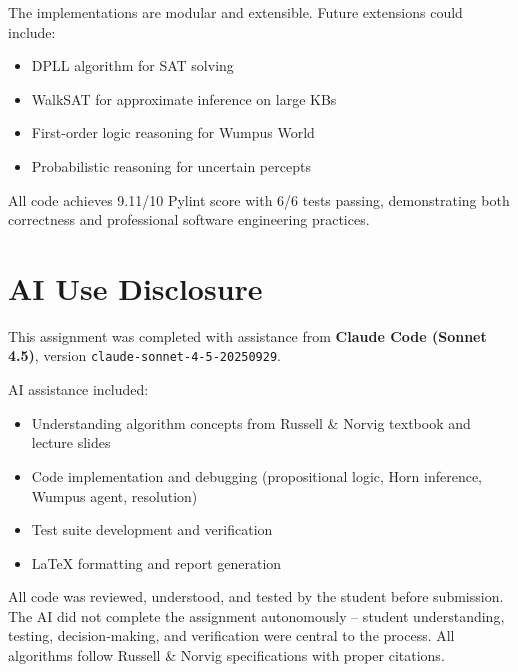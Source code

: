 \documentclass[letterpaper]{article}
\begin{document}
The implementations are modular and extensible. Future extensions could include:
\begin{itemize}
\item DPLL algorithm for SAT solving
\item WalkSAT for approximate inference on large KBs
\item First-order logic reasoning for Wumpus World
\item Probabilistic reasoning for uncertain percepts
\end{itemize}

All code achieves 9.11/10 Pylint score with 6/6 tests passing, demonstrating both correctness and professional software engineering practices.

\section*{AI Use Disclosure}

This assignment was completed with assistance from \textbf{Claude Code (Sonnet 4.5)}, version \texttt{claude-sonnet-4-5-20250929}.

AI assistance included:
\begin{itemize}
\item Understanding algorithm concepts from Russell \& Norvig textbook and lecture slides
\item Code implementation and debugging (propositional logic, Horn inference, Wumpus agent, resolution)
\item Test suite development and verification
\item LaTeX formatting and report generation
\end{itemize}

All code was reviewed, understood, and tested by the student before submission. The AI did not complete the assignment autonomously -- student understanding, testing, decision-making, and verification were central to the process. All algorithms follow Russell \& Norvig specifications with proper citations.



\end{document}

